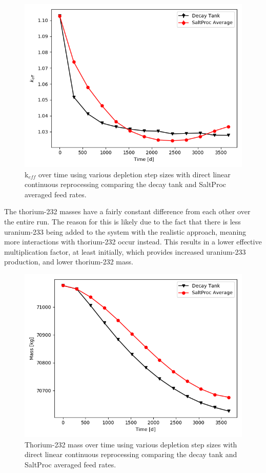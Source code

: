 \begin{figure}[H]
  \centering
  \includegraphics[scale=0.7]{images/adv-keff.png}
  \caption{k$_{eff}$ over time using various depletion step sizes with direct linear continuous reprocessing comparing the decay tank and SaltProc averaged feed rates.}
   \label{fig:DL-cont-k-adv}
\end{figure}

The thorium-232 masses have a fairly constant difference from each other over the entire run. The reason for this is likely due to the fact that there is less uranium-233 being added to the system with the realistic approach, meaning more interactions with thorium-232 occur instead. This results in a lower effective multiplication factor, at least initially, which provides increased uranium-233 production, and lower thorium-232 mass.

\begin{figure}[H]
  \centering
  \includegraphics[scale=0.7]{images/adv-Th232.png}
  \caption{Thorium-232 mass over time using various depletion step sizes with direct linear continuous reprocessing comparing the decay tank and SaltProc averaged feed rates.}
   \label{fig:DL-cont-th-adv}
\end{figure}

